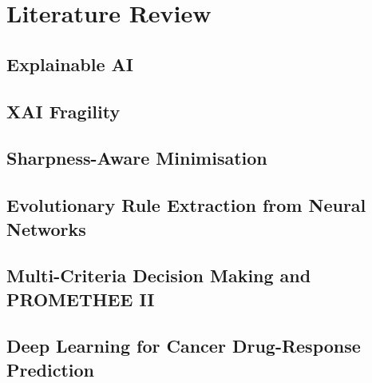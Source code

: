 \documentclass[../main.tex]{subfiles}
\begin{document}
\chapter{Literature Review}
\label{ch:lit-review}


\section{Explainable AI}
\label{sec:lit-xai}

\section{XAI Fragility}
\label{sec:lit-fragility}

\section{Sharpness-Aware Minimisation}
\label{sec:lit-sam}

\section{Evolutionary Rule Extraction from Neural Networks}
\label{sec:lit-rule-extraction}

\section{Multi-Criteria Decision Making and PROMETHEE II}
\label{sec:lit-promethee}

\section{Deep Learning for Cancer Drug-Response Prediction}
\label{sec:lit-drug-response}
\end{document}

